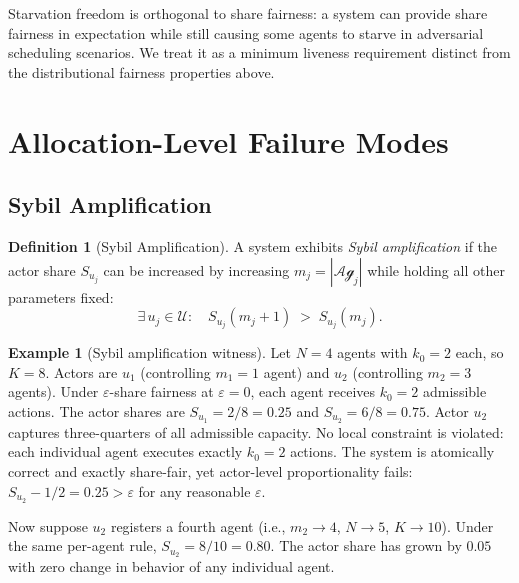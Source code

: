 \documentclass[11pt]{article}
\theoremstyle{plain}
\theoremstyle{definition}
\newtheorem{definition}[theorem]{Definition}
\newtheorem{example}[theorem]{Example}
\theoremstyle{remark}
\newcommand{\Agents}{\mathcal{Ag}}         %
\newcommand{\Actors}{\mathcal{U}}          %
\newcommand{\Share}[1]{S_{#1}}             %
\newcommand{\kbound}{k_0}                  %
\newcommand{\Kcap}{K}                      %
\begin{document}
Starvation freedom is orthogonal to share fairness: a system can
provide share fairness in expectation while still causing some agents
to starve in adversarial scheduling scenarios.  We treat it as a
minimum liveness requirement distinct from the distributional
fairness properties above.

\section{Allocation-Level Failure Modes}
\label{sec:failure-modes}

%
%
%

\subsection{Sybil Amplification}
\label{sec:sybil}

\begin{definition}[Sybil Amplification]
\label{def:sybil}
A system exhibits \emph{Sybil amplification} if the actor share
$\Share{u_j}$ can be increased by increasing $m_j = |\Agents_j|$
while holding all other parameters fixed:
\[
  \exists\, u_j \in \Actors : \quad
  \Share{u_j}(m_j + 1) \;>\; \Share{u_j}(m_j).
\]
\end{definition}

\begin{example}[Sybil amplification witness]
\label{ex:sybil}
Let $N = 4$ agents with $\kbound = 2$ each, so $\Kcap = 8$.  Actors
are $u_1$ (controlling $m_1 = 1$ agent) and $u_2$ (controlling $m_2 =
3$ agents).  Under $\varepsilon$-share fairness at $\varepsilon = 0$,
each agent receives $\kbound = 2$ admissible actions.  The actor shares
are $\Share{u_1} = 2/8 = 0.25$ and $\Share{u_2} = 6/8 = 0.75$.
Actor $u_2$ captures three-quarters of all admissible capacity.  No
local constraint is violated: each individual agent executes exactly
$\kbound = 2$ actions.  The system is atomically correct and
exactly share-fair, yet actor-level proportionality fails:
$\Share{u_2} - 1/2 = 0.25 > \varepsilon$ for any reasonable $\varepsilon$.

Now suppose $u_2$ registers a fourth agent (i.e., $m_2 \to 4$,
$N \to 5$, $\Kcap \to 10$).  Under the same per-agent rule,
$\Share{u_2} = 8/10 = 0.80$.  The actor share has grown by $0.05$
with zero change in behavior of any individual agent.
\end{example}
\end{document}
